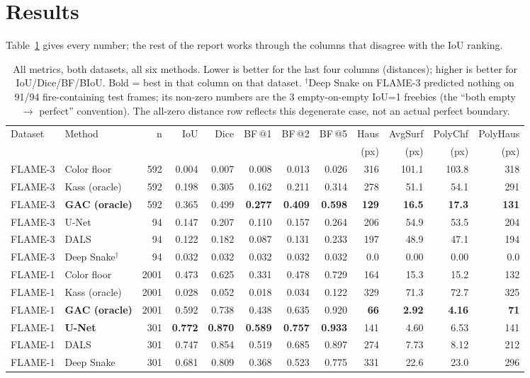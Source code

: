 \documentclass[10pt]{article}
\begin{document}
\section{Results}

Table~\ref{tab:all} gives every number; the rest of the report works through
the columns that disagree with the IoU ranking.

\begin{table}[H]
\centering\scriptsize
\begin{tabular}{llrrrrrrrrrr}
\toprule
Dataset & Method & n & IoU & Dice & BF\,@1 & BF\,@2 & BF\,@5 & Haus & AvgSurf & PolyChf & PolyHaus \\
& & & & & & & & (px) & (px) & (px) & (px) \\
\midrule
FLAME-3 & Color floor      & 592 & 0.004 & 0.007 & 0.008 & 0.013 & 0.026 & 316 & 101.1 & 103.8 & 318 \\
FLAME-3 & Kass (oracle)    & 592 & 0.198 & 0.305 & 0.162 & 0.211 & 0.314 & 278 & 51.1  & 54.1  & 291 \\
FLAME-3 & \textbf{GAC (oracle)} & 592 & 0.365 & 0.499 & \textbf{0.277} & \textbf{0.409} & \textbf{0.598} & \textbf{129} & \textbf{16.5} & \textbf{17.3} & \textbf{131} \\
FLAME-3 & U-Net            & 94  & 0.147 & 0.207 & 0.110 & 0.157 & 0.264 & 206 & 54.9  & 53.5  & 204 \\
FLAME-3 & DALS             & 94  & 0.122 & 0.182 & 0.087 & 0.131 & 0.233 & 197 & 48.9  & 47.1  & 194 \\
FLAME-3 & Deep Snake$^\dag$ & 94  & 0.032 & 0.032 & 0.032 & 0.032 & 0.032 & 0.0 & 0.00  & 0.00  & 0.0 \\
\midrule
FLAME-1 & Color floor      & 2001 & 0.473 & 0.625 & 0.331 & 0.478 & 0.729 & 164 & 15.3 & 15.2 & 132 \\
FLAME-1 & Kass (oracle)    & 2001 & 0.028 & 0.052 & 0.018 & 0.034 & 0.122 & 329 & 71.3 & 72.7 & 325 \\
FLAME-1 & \textbf{GAC (oracle)} & 2001 & 0.592 & 0.738 & 0.438 & 0.635 & 0.920 & \textbf{66}  & \textbf{2.92} & \textbf{4.16} & \textbf{71}  \\
FLAME-1 & \textbf{U-Net}   & 301  & \textbf{0.772} & \textbf{0.870} & \textbf{0.589} & \textbf{0.757} & \textbf{0.933} & 141 & 4.60 & 6.53 & 141 \\
FLAME-1 & DALS             & 301  & 0.747 & 0.854 & 0.519 & 0.685 & 0.897 & 274 & 7.73 & 8.12 & 212 \\
FLAME-1 & Deep Snake       & 301  & 0.681 & 0.809 & 0.368 & 0.523 & 0.775 & 331 & 22.6 & 23.0 & 296 \\
\bottomrule
\end{tabular}
\caption{All metrics, both datasets, all six methods. Lower is better for the
last four columns (distances); higher is better for IoU/Dice/BF/BIoU. Bold = best
in that column on that dataset.\quad
$^\dag$Deep Snake on FLAME-3 predicted nothing on 91/94 fire-containing test
frames; its non-zero numbers are the 3 empty-on-empty IoU=1 freebies (the
``both empty $\to$ perfect'' convention). The all-zero distance row reflects
this degenerate case, not an actual perfect boundary.}
\label{tab:all}
\end{table}
\end{document}
